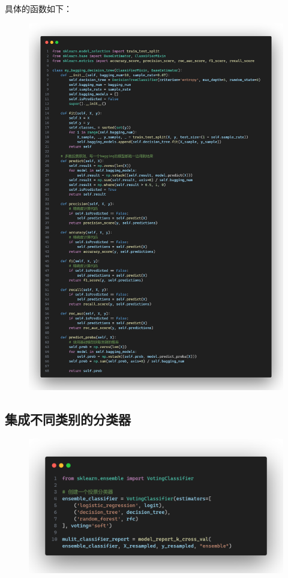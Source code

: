 \documentclass{article}
\begin{document}
具体的函数如下：
\begin{figure}[H]
	\centering
	\includegraphics[width=\textwidth]{./img/hand_bagging.png}
\end{figure}

\subsection{集成不同类别的分类器}

\begin{figure}[H]
	\centering
	\includegraphics[width=\textwidth]{./img/mult_voting.png}
\end{figure}
\end{document}
